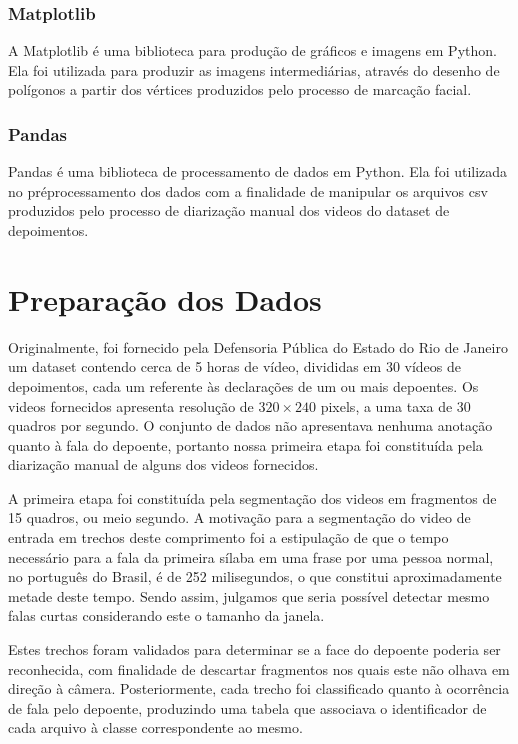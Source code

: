 \subsubsection{Matplotlib}

A Matplotlib\cite{Hunter:2007} é uma biblioteca para produção de gráficos e imagens em Python. Ela foi utilizada para produzir as imagens intermediárias, através do desenho de polígonos a partir dos vértices produzidos pelo processo de marcação facial.

\subsubsection{Pandas}

Pandas\cite{mckinney-proc-scipy-2010} é uma biblioteca de processamento de dados em Python. Ela foi utilizada no préprocessamento dos dados com a finalidade de manipular os arquivos csv produzidos pelo processo de diarização manual dos videos do dataset de depoimentos.

\section{Preparação dos Dados}
\label{sec:preproc}

Originalmente, foi fornecido pela Defensoria Pública do Estado do Rio de Janeiro um dataset contendo cerca de 5 horas de vídeo, divididas em 30 vídeos de depoimentos, cada um referente às declarações de um ou mais depoentes. Os videos fornecidos apresenta resolução de $320\times240$ pixels, a uma taxa de 30 quadros por segundo. O conjunto de dados não apresentava nenhuma anotação quanto à fala do depoente, portanto nossa primeira etapa foi constituída pela diarização manual de alguns dos videos fornecidos.

A primeira etapa foi constituída pela segmentação dos videos em fragmentos de 15 quadros, ou meio segundo. A motivação para a segmentação do video de entrada em trechos deste comprimento foi a estipulação de que o tempo necessário para a fala da primeira sílaba em uma frase por uma pessoa normal, no português do Brasil, é de 252 milisegundos\cite{barbosaSyllabletimingBrazilianPortuguese2000}, o que constitui aproximadamente metade deste tempo. Sendo assim, julgamos que seria possível detectar mesmo falas curtas considerando este o tamanho da janela.

Estes trechos foram validados para determinar se a face do depoente poderia ser reconhecida, com finalidade de descartar fragmentos nos quais este não olhava em direção à câmera. Posteriormente, cada trecho foi classificado quanto à ocorrência de fala pelo depoente, produzindo uma tabela que associava o identificador de cada arquivo à classe correspondente ao mesmo.

